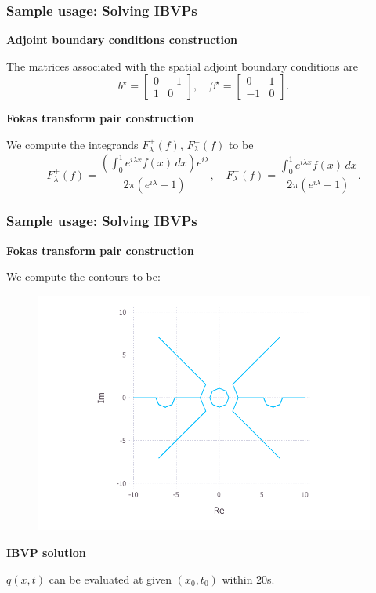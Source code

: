 \documentclass{beamer}
\begin{document}
\begin{frame}
    \frametitle{Sample usage: Solving IBVPs}
    \textbf{Adjoint boundary conditions construction}

    The matrices associated with the spatial adjoint boundary conditions are
    \[b^\star = \begin{bmatrix}0&-1\\ 1&0\end{bmatrix},\quad \beta^\star = \begin{bmatrix}0&1\\ -1&0\end{bmatrix}.\]

    \textbf{Fokas transform pair construction}

    We compute the integrands $F_\lambda^+(f)$, $F_\lambda^-(f)$ to be
    \[F_\lambda^+(f) = \frac{\left(\int_0^1 e^{i\lambda x}f(x)\,dx\right)e^{i\lambda}}{2\pi(e^{i\lambda}-1)},\quad F_\lambda^-(f) = \frac{\int_0^1 e^{i\lambda x}f(x)\,dx}{2\pi(e^{i\lambda}-1)}.\]
\end{frame}

\begin{frame}
    \frametitle{Sample usage: Solving IBVPs}
    \textbf{Fokas transform pair construction}

    We compute the contours to be:
    \begin{figure}[htpb!]
        \centering
        \includegraphics[width=0.7\linewidth]{ex1_contourPlot.pdf}
    \end{figure}
    \textbf{IBVP solution}

    $q(x,t)$ can be evaluated at given $(x_0, t_0)$ within $20$s.
\end{frame}
\end{document}
